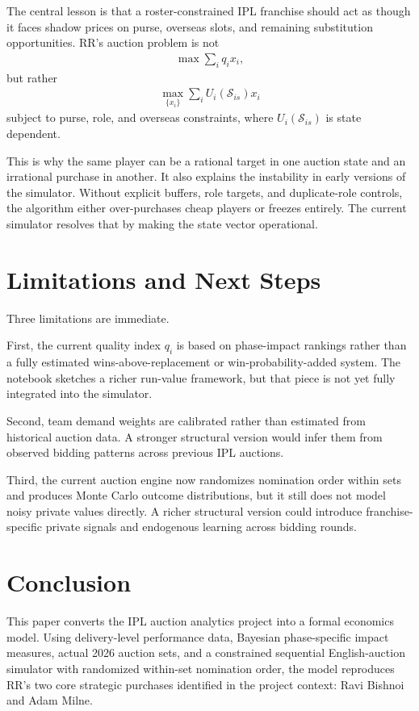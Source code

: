 \documentclass[11pt]{article}
\begin{document}
The central lesson is that a roster-constrained IPL franchise should act as though it faces shadow prices on purse, overseas slots, and remaining substitution opportunities. RR's auction problem is not
\begin{align}
\max \sum_i q_i x_i,
\end{align}
but rather
\begin{align}
\max_{\{x_i\}} \sum_i U_i(\mathcal{S}_{is})x_i
\end{align}
subject to purse, role, and overseas constraints, where \(U_i(\mathcal{S}_{is})\) is state dependent.

This is why the same player can be a rational target in one auction state and an irrational purchase in another. It also explains the instability in early versions of the simulator. Without explicit buffers, role targets, and duplicate-role controls, the algorithm either over-purchases cheap players or freezes entirely. The current simulator resolves that by making the state vector operational.

\section{Limitations and Next Steps}

Three limitations are immediate.

First, the current quality index \(q_i\) is based on phase-impact rankings rather than a fully estimated wins-above-replacement or win-probability-added system. The notebook sketches a richer run-value framework, but that piece is not yet fully integrated into the simulator.

Second, team demand weights are calibrated rather than estimated from historical auction data. A stronger structural version would infer them from observed bidding patterns across previous IPL auctions.

Third, the current auction engine now randomizes nomination order within sets and produces Monte Carlo outcome distributions, but it still does not model noisy private values directly. A richer structural version could introduce franchise-specific private signals and endogenous learning across bidding rounds.

\section{Conclusion}

This paper converts the IPL auction analytics project into a formal economics model. Using delivery-level performance data, Bayesian phase-specific impact measures, actual 2026 auction sets, and a constrained sequential English-auction simulator with randomized within-set nomination order, the model reproduces RR's two core strategic purchases identified in the project context: Ravi Bishnoi and Adam Milne.
\end{document}
